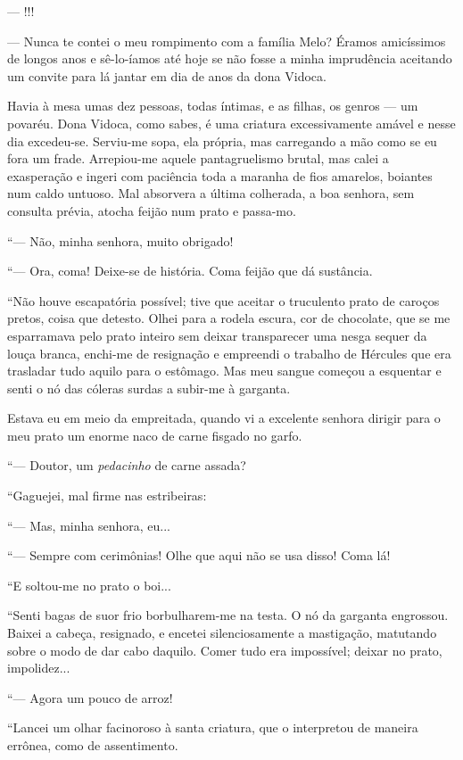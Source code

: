 --- !!!

--- Nunca te contei o meu rompimento com a família Melo? Éramos
amicíssimos de longos anos e sê-lo-íamos até hoje se não fosse a minha
imprudência aceitando um convite para lá jantar em dia de anos da dona
Vidoca.

Havia à mesa umas dez pessoas, todas íntimas, e as filhas, os genros ---
um povaréu. Dona Vidoca, como sabes, é uma criatura excessivamente
amável e nesse dia excedeu-se. Serviu-me sopa, ela própria, mas
carregando a mão como se eu fora um frade. Arrepiou-me aquele
pantagruelismo brutal, mas calei a exasperação e ingeri com paciência
toda a maranha de fios amarelos, boiantes num caldo untuoso. Mal
absorvera a última colherada, a boa senhora, sem consulta prévia, atocha
feijão num prato e passa-mo.

``--- Não, minha senhora, muito obrigado!

``--- Ora, coma! Deixe-se de história. Coma feijão que dá sustância.

``Não houve escapatória possível; tive que aceitar o truculento prato de
caroços pretos, coisa que detesto. Olhei para a rodela escura, cor de
chocolate, que se me esparramava pelo prato inteiro sem deixar
transparecer uma nesga sequer da louça branca, enchi-me de resignação e
empreendi o trabalho de Hércules que era trasladar tudo aquilo para o
estômago. Mas meu sangue começou a esquentar e senti o nó das cóleras
surdas a subir-me à garganta.

Estava eu em meio da empreitada, quando vi a excelente senhora dirigir
para o meu prato um enorme naco de carne fisgado no garfo.

``--- Doutor, um \emph{pedacinho} de carne assada?

``Gaguejei, mal firme nas estribeiras:

``--- Mas, minha senhora, eu...

``--- Sempre com cerimônias! Olhe que aqui não se usa disso! Coma lá!

``E soltou-me no prato o boi...

``Senti bagas de suor frio borbulharem-me na testa. O nó da garganta
engrossou. Baixei a cabeça, resignado, e encetei silenciosamente a
mastigação, matutando sobre o modo de dar cabo daquilo. Comer tudo era
impossível; deixar no prato, impolidez...

``--- Agora um pouco de arroz!

``Lancei um olhar facinoroso à santa criatura, que o interpretou de
maneira errônea, como de assentimento.

